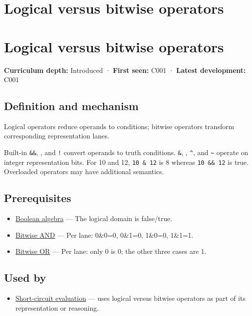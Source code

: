 \hypertarget{appendix-fe6b457d68d8}{}
\section*{Logical versus bitwise operators}
\section{Logical versus bitwise operators}\label{logical-versus-bitwise-operators}

\textbf{Curriculum depth:} Introduced · \textbf{First seen:} C001 · \textbf{Latest development:} C001

\subsection{Definition and mechanism}\label{definition-and-mechanism}

Logical operators reduce operands to conditions; bitwise operators transform corresponding representation lanes.

Built-in \texttt{\&\&}, \texttt{\textbar{}\textbar{}}, and \texttt{!} convert operands to truth conditions. \texttt{\&}, \texttt{\textbar{}}, \texttt{\^{}}, and \texttt{\textasciitilde{}} operate on integer representation bits. For 10 and 12, \texttt{10\ \&\ 12} is 8 whereas \texttt{10\ \&\&\ 12} is true. Overloaded operators may have additional semantics.

\subsection{Prerequisites}\label{prerequisites}

\begin{itemize}
\tightlist
\item
  \hyperref[appendix-24475e1596a8]{Boolean algebra} --- The logical domain is false/true.
\item
  \hyperref[appendix-68b52453737c]{Bitwise AND} --- Per lane: 0\&0=0, 0\&1=0, 1\&0=0, 1\&1=1.
\item
  \hyperref[appendix-a427ce8ce8a6]{Bitwise OR} --- Per lane: only 0 is 0; the other three cases are 1.
\end{itemize}

\subsection{Used by}\label{used-by}

\begin{itemize}
\tightlist
\item
  \hyperref[appendix-2e245a6fa8d3]{Short-circuit evaluation} --- uses logical versus bitwise operators as part of its representation or reasoning.
\end{itemize}

